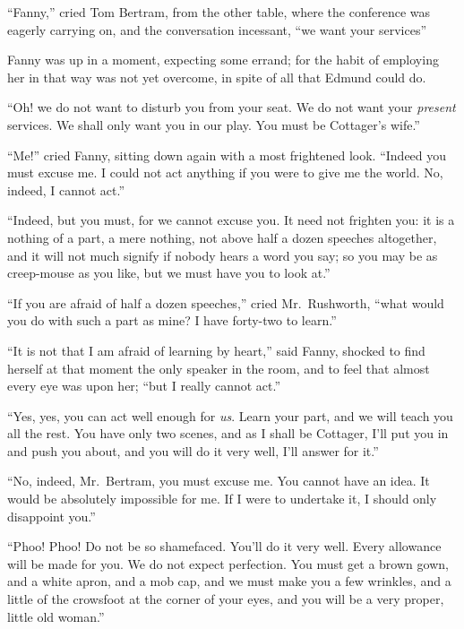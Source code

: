 \documentclass{article}
\begin{document}
``Fanny,'' cried Tom Bertram, from the other table,
where the conference was eagerly carrying on, and the
conversation incessant, ``we want your services''

Fanny was up in a moment, expecting some errand; for the
habit of employing her in that way was not yet overcome,
in spite of all that Edmund could do.

``Oh! we do not want to disturb you from your seat.
We do not want your \emph{present} services.  We shall only want
you in our play.  You must be Cottager's wife.''

``Me!'' cried Fanny, sitting down again with a most frightened look.
``Indeed you must excuse me.  I could not act anything
if you were to give me the world.  No, indeed, I cannot act.''

``Indeed, but you must, for we cannot excuse you.
It need not frighten you:  it is a nothing of a part,
a mere nothing, not above half a dozen speeches altogether,
and it will not much signify if nobody hears a word you say;
so you may be as creep-mouse as you like, but we must have
you to look at.''

``If you are afraid of half a dozen speeches,'' cried Mr.\ Rushworth,
``what would you do with such a part as mine?  I have forty-two to
learn.''

``It is not that I am afraid of learning by heart,''
said Fanny, shocked to find herself at that moment the
only speaker in the room, and to feel that almost every
eye was upon her; ``but I really cannot act.''

``Yes, yes, you can act well enough for \emph{us}.
Learn your part, and we will teach you all the rest.
You have only two scenes, and as I shall be Cottager,
I'll put you in and push you about, and you will do it
very well, I'll answer for it.''

``No, indeed, Mr.\ Bertram, you must excuse me.  You cannot
have an idea.  It would be absolutely impossible for me.
If I were to undertake it, I should only disappoint you.''

``Phoo!  Phoo!  Do not be so shamefaced.  You'll do it
very well.  Every allowance will be made for you.
We do not expect perfection.  You must get a brown gown,
and a white apron, and a mob cap, and we must make
you a few wrinkles, and a little of the crowsfoot at
the corner of your eyes, and you will be a very proper,
little old woman.''
\end{document}
